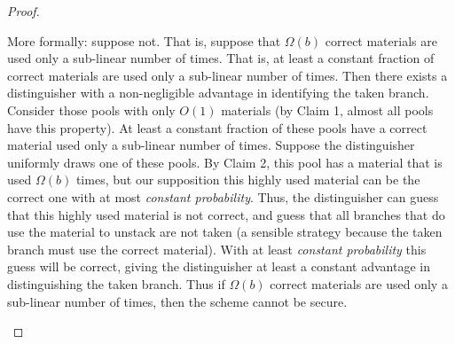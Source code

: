 \begin{proof}
\begin{itemize}
\begin{subproof}
    More formally: suppose not.
    That is, suppose that $\Omega(b)$ correct materials are used only a
    sub-linear number of times.
    That is, at least a constant fraction of correct materials are used only a
    sub-linear number of times.
    Then there exists a distinguisher with a non-negligible advantage
    in identifying the taken branch.
    Consider those pools with
    only $O(1)$ materials (by Claim 1, almost all pools have this
    property). At least a constant fraction of
    these pools have a correct material used only a sub-linear
    number of times.
    Suppose the distinguisher uniformly draws one of these pools.
    By Claim 2, this pool has a material that is used $\Omega(b)$
    times, but our supposition this highly used material can be the
    correct one with at most \emph{constant probability}.
    Thus, the distinguisher can guess that this highly used material
    is not correct, and guess that all branches that do use the
    material to unstack are not taken (a sensible strategy because the
    taken branch must use the correct material).
    With at least \emph{constant probability} this guess will be correct,
    giving the distinguisher at least a constant advantage in distinguishing
    the taken branch.
    Thus if $\Omega(b)$ correct materials are used only a
    sub-linear number of times, then the scheme cannot be secure.
  \end{subproof}
\end{itemize}


\end{proof}
